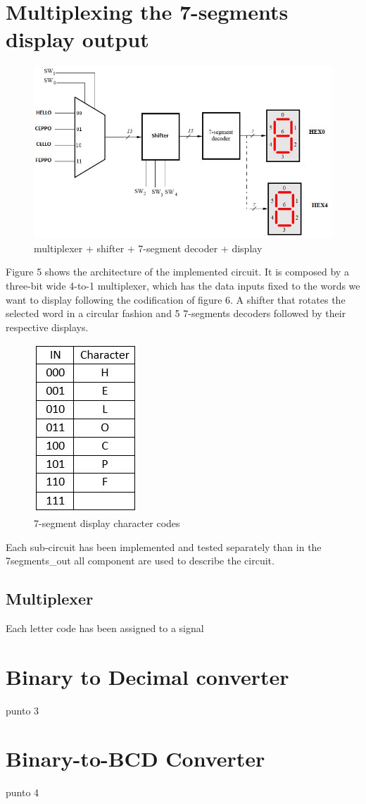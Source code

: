 \documentclass[12pt]{article}
\begin{document}
\section{ Multiplexing the 7-segments display output}
\begin{figure}[h]
	\centering
	\includegraphics[scale = 0.7]{Berchialla_PuntoB/image1.jpg}
	\caption{multiplexer + shifter + 7-segment decoder + display}
\end{figure}
	Figure 5 shows the architecture of the implemented circuit. It is composed by a three-bit wide 4-to-1 multiplexer, which has the data inputs fixed to the words we want to display following the codification of figure 6. A shifter that rotates the selected word in a circular fashion and 5 7-segments decoders followed by their respective displays.


\begin{figure}[h]
	\centering
	\includegraphics[scale = 0.4]{Berchialla_PuntoB/image2.jpg}
	\caption{7-segment display character codes}
\end{figure}

Each sub-circuit has been implemented and tested separately than in the 7segments_out all component are used to describe the circuit.

\subsection{Multiplexer}
Each letter code has been assigned to a signal 

\section{ Binary to Decimal converter}
punto 3
\section{ Binary-to-BCD Converter}
punto 4
\end{document}
